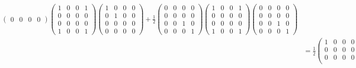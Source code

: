 \documentclass{article}%
\begin{document}
\begin{enumerate}
\begin{align*}
\begin{pmatrix}
                                        0 & 0 & 0 & 0
                                    \end{pmatrix}
              \begin{pmatrix}
                  1 & 0 & 0 & 1 \\
                  0 & 0 & 0 & 0 \\
                  0 & 0 & 0 & 0 \\
                  1 & 0 & 0 & 1
              \end{pmatrix}
              \begin{pmatrix}
                  1 & 0 & 0 & 0 \\
                  0 & 1 & 0 & 0 \\
                  0 & 0 & 0 & 0 \\
                  0 & 0 & 0 & 0
              \end{pmatrix}
              + \frac{1}{2} \begin{pmatrix}
                                0 & 0 & 0 & 0 \\
                                0 & 0 & 0 & 0 \\
                                0 & 0 & 1 & 0 \\
                                0 & 0 & 0 & 1
                            \end{pmatrix}
              \begin{pmatrix}
                  1 & 0 & 0 & 1 \\
                  0 & 0 & 0 & 0 \\
                  0 & 0 & 0 & 0 \\
                  1 & 0 & 0 & 1
              \end{pmatrix}
              \begin{pmatrix}
                  0 & 0 & 0 & 0 \\
                  0 & 0 & 0 & 0 \\
                  0 & 0 & 1 & 0 \\
                  0 & 0 & 0 & 1
              \end{pmatrix}                       \\
                    & = \frac{1}{2} \begin{pmatrix}
                                        1 & 0 & 0 & 0 \\
                                        0 & 0 & 0 & 0 \\
                                        0 & 0 & 0 & 0 \\

\end{pmatrix}
\end{align*}
\end{enumerate}
\end{document}

